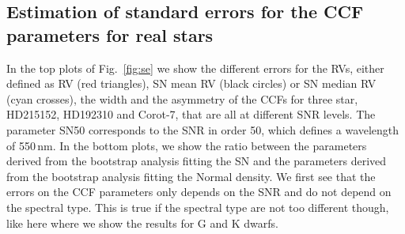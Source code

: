 \documentclass{aa}
\def\kms{\hbox{\,km\,s$^{-1}$}}       %
\begin{document}
%
%

\subsection{Estimation of standard errors for the CCF parameters for real stars} \label{sec:bootstrap_real_star}
In the top plots of Fig.~\ref{fig:se} we show the different errors for the RVs, either defined as RV (red triangles), SN mean RV (black circles) or SN median RV (cyan crosses), the width and the asymmetry of the CCFs for three star, HD215152, HD192310 and Corot-7, that are all at different SNR levels. The parameter SN50 corresponds to the SNR in order 50, which defines a wavelength of 550\,nm. In the bottom plots, we show the ratio between the parameters derived from the bootstrap analysis fitting the SN and the parameters derived from the bootstrap analysis fitting the Normal density. We first see that the errors on the CCF parameters only depends on the SNR and do not depend on the spectral type. This is true if the spectral type are not too different though, like here where we show the results for G and K dwarfs.
\end{document}
